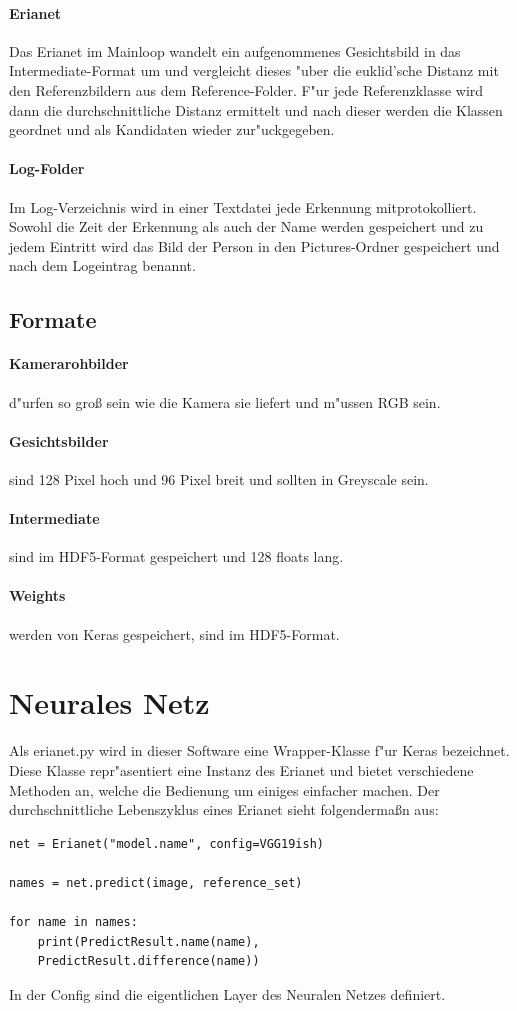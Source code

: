 \documentclass[12pt]{article}
\begin{document}
\paragraph{Erianet}
Das Erianet im Mainloop wandelt ein aufgenommenes Gesichtsbild in
das Intermediate-Format um und vergleicht dieses "uber die 
euklid'sche Distanz mit den Referenzbildern aus dem Reference-Folder.
F"ur jede Referenzklasse wird dann die durchschnittliche Distanz
ermittelt und nach dieser werden die Klassen geordnet und als
Kandidaten wieder zur"uckgegeben.
\paragraph{Log-Folder}
Im Log-Verzeichnis wird in einer Textdatei jede Erkennung mitprotokolliert.
Sowohl die Zeit der Erkennung als auch der Name werden gespeichert und zu
jedem Eintritt wird das Bild der Person in den Pictures-Ordner gespeichert
und nach dem Logeintrag benannt.
\subsection{Formate}
\paragraph{Kamerarohbilder}
d"urfen so gro{\ss} sein wie die Kamera sie liefert und m"ussen RGB sein.
\paragraph{Gesichtsbilder}
sind 128 Pixel hoch und 96 Pixel breit und sollten in Greyscale 
sein.
\paragraph{Intermediate}
sind im HDF5-Format gespeichert und 128 floats lang.
\paragraph{Weights}
werden von Keras gespeichert, sind im HDF5-Format. 

\pagebreak
\section{Neurales Netz}
Als erianet.py wird in dieser Software eine Wrapper-Klasse f"ur 
Keras bezeichnet. Diese Klasse repr"asentiert eine Instanz des 
Erianet und bietet verschiedene Methoden an, welche die 
Bedienung um einiges einfacher machen. Der durchschnittliche
Lebenszyklus eines Erianet sieht folgenderma{\ss}n aus:
\begin{lstlisting}[frame=single]
net = Erianet("model.name", config=VGG19ish)

names = net.predict(image, reference_set)

for name in names:
    print(PredictResult.name(name), 
    PredictResult.difference(name))
\end{lstlisting}
In der Config sind die eigentlichen Layer des Neuralen Netzes definiert.
\end{document}
